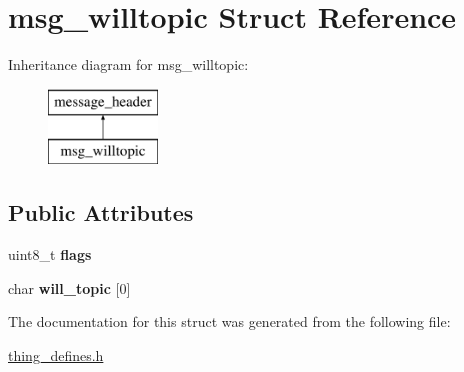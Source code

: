 \hypertarget{structmsg__willtopic}{\section{msg\-\_\-willtopic Struct Reference}
\label{structmsg__willtopic}
}
Inheritance diagram for msg\-\_\-willtopic\-:\begin{figure}[H]
\begin{center}
\leavevmode
\includegraphics[height=2.000000cm]{structmsg__willtopic}
\end{center}
\end{figure}
\subsection*{Public Attributes}
\begin{DoxyCompactItemize}
\item 
\hypertarget{structmsg__willtopic_a5237e6b07977b4136bacfa87556c6acd}{uint8\-\_\-t {\bfseries flags}}\label{structmsg__willtopic_a5237e6b07977b4136bacfa87556c6acd}

\item 
\hypertarget{structmsg__willtopic_a5814f73f2d1c453f99f1ccd8fc955d6d}{char {\bfseries will\-\_\-topic} \mbox{[}0\mbox{]}}\label{structmsg__willtopic_a5814f73f2d1c453f99f1ccd8fc955d6d}

\end{DoxyCompactItemize}


The documentation for this struct was generated from the following file\-:\begin{DoxyCompactItemize}
\item 
\hyperlink{thing__defines_8h}{thing\-\_\-defines.\-h}\end{DoxyCompactItemize}
